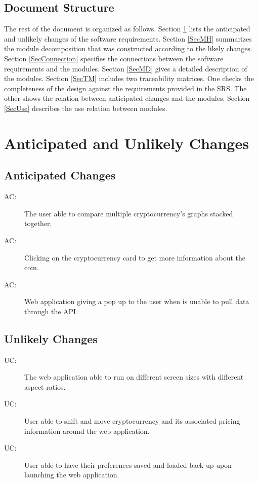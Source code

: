 \documentclass[12pt, titlepage]{article}
\newcounter{acnum}
\newcommand{\actheacnum}{AC\theacnum}
\newcounter{ucnum}
\newcommand{\uctheucnum}{UC\theucnum}
\begin{document}
\subsection{Document Structure}

The rest of the document is organized as follows. Section
\ref{SecChange} lists the anticipated and unlikely changes of the software
requirements. Section \ref{SecMH} summarizes the module decomposition that
was constructed according to the likely changes. Section \ref{SecConnection}
specifies the connections between the software requirements and the
modules. Section \ref{SecMD} gives a detailed description of the
modules. Section \ref{SecTM} includes two traceability matrices. One checks
the completeness of the design against the requirements provided in the SRS. The
other shows the relation between anticipated changes and the modules. Section
\ref{SecUse} describes the use relation between modules.


\section{Anticipated and Unlikely Changes} \label{SecChange}

\subsection{Anticipated Changes} \label{SecAchange}

\begin{description}
\item[ \actheacnum \label{acMulti}:] The user able to compare multiple cryptocurrency's graphs stacked together.
\item[ \actheacnum \label{acCoin}:] Clicking on the cryptocurrency card to get more information about the coin. 
\item[ \actheacnum \label{acError}:] Web application giving a pop up to the user when is unable to pull data through the API.
\end{description}

\subsection{Unlikely Changes} \label{SecUchange}

\begin{description}
\item[ \uctheucnum :] The web application able to run on different screen sizes with different aspect ratios.
\item[ \uctheucnum :] User able to shift and move cryptocurrency and its associated pricing information around the web application. 
\item[ \uctheucnum :] User able to have their preferences saved and loaded back up upon launching the web application.
\end{description}
\end{document}

